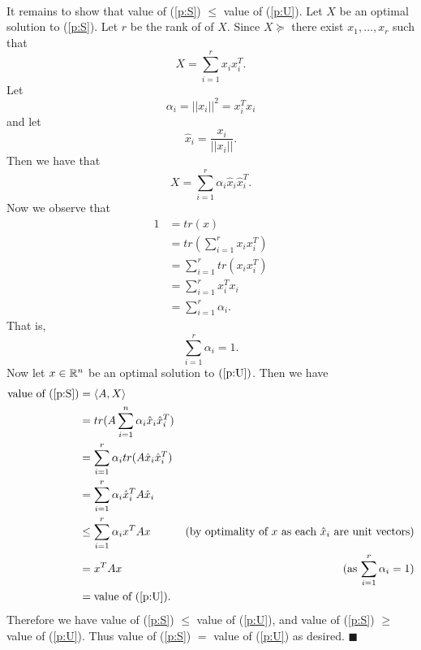 \documentclass[letterpaper,12pt,oneside,onecolumn]{article}
\begin{document}
\paragraph{}
It remains to show that value of (\ref{p:S}) $\leq$ value of (\ref{p:U}). Let $X$ be an optimal solution to (\ref{p:S}). Let $r$ be the rank of of $X$. Since $X\succcurlyeq$ there exist $x_1, \dots, x_r$ such that
$$X = \sum_{i=1}^r x_i x_i^T.$$
Let $$\alpha_i = ||x_i||^2 = x_i^Tx_i$$
and let $$\hat{x}_i = \frac{x_i}{||x_i||}.$$
Then we have that
$$X = \sum_{i=1}^r \alpha_i \hat{x}_i\hat{x}_i^T.$$
Now we observe that
\begin{align*}
1 &= tr(x) \\
&= tr(\sum_{i=1}^r x_i x_i^T) \\
&=\sum_{i=1}^r tr(x_i x_i^T) \\
&= \sum_{i=1}^r x_i^T x_i \\
&= \sum_{i=1}^r \alpha_i.
\end{align*}
That is,
$$\sum_{i=1}^r \alpha_i = 1.$$
Now let $x \in \mathbb{R}^n$ be an optimal solution to $(\ref{p:U})$. Then we have
\begin{align*}
\text{value of (\ref{p:S})} &= \langle A,X \rangle \\
&= tr(A\sum_{i=1}^n \alpha_i \hat{x}_i\hat{x}_i^T) \\
&= \sum_{i=1}^r \alpha_i tr(A\hat{x}_i\hat{x}_i^T) \\
&= \sum_{i=1}^r \alpha_i \hat{x}_i^TA\hat{x}_i \\
&\leq \sum_{i=1}^r \alpha_i x^TAx &\text{(by optimality of $x$ as each $\hat{x}_i$ are unit vectors)} \\
&= x^TAx &\text{(as $\sum_{i=1}^r \alpha_i = 1$)} \\
&= \text{value of (\ref{p:U})}.
\end{align*}
Therefore we have value of (\ref{p:S}) $\leq$ value of (\ref{p:U}), and value of (\ref{p:S}) $\geq$ value of (\ref{p:U}). Thus value of (\ref{p:S}) $=$ value of (\ref{p:U}) as desired. $\blacksquare$
\paragraph{}
\end{document}
